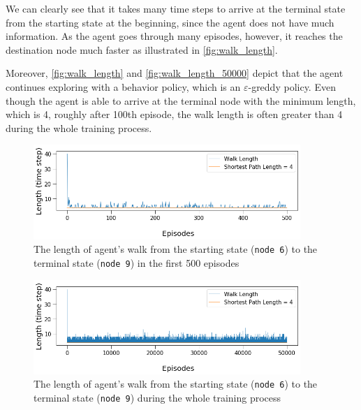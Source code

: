 We can clearly see that it takes many time steps to arrive at the terminal state from the starting state at the beginning, since the agent does not have much information. As the agent goes through many episodes, however, it reaches the destination node much faster as illustrated in \autoref{fig:walk_length}.

Moreover, \autoref{fig:walk_length} and \autoref{fig:walk_length_50000} depict that the agent continues exploring with a behavior policy, which is an $\varepsilon$-greddy policy. Even though the agent is able to arrive at the terminal node with the minimum length, which is 4, roughly after 100th episode, the walk length is often greater than 4 during the whole training process.

\begin{figure}[hbt!]
    \centering
    \includegraphics[width=0.9\textwidth]{figures/Reinforcement/walk_length_500.png}
    \caption{The length of agent's walk from the starting state (\texttt{node 6}) to the terminal state (\texttt{node 9}) in the first 500 episodes}
    \label{fig:walk_length}
\end{figure}
\begin{figure}[hbt!]
    \centering
    \includegraphics[width=0.9\textwidth]{figures/Reinforcement/walk_length.png}
    \caption{The length of agent's walk from the starting state (\texttt{node 6}) to the terminal state (\texttt{node 9}) during the whole training process}
    \label{fig:walk_length_50000}
\end{figure}

